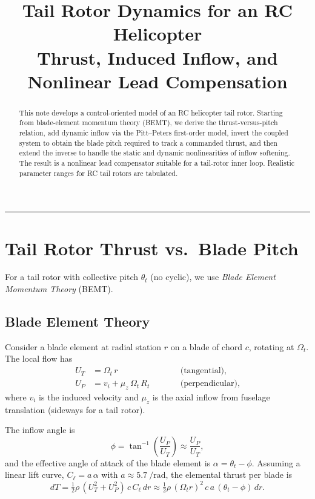 \documentclass[11pt,a4paper]{article}
\title{\textbf{Tail Rotor Dynamics for an RC Helicopter}\\[4pt]
\large Thrust, Induced Inflow, and Nonlinear Lead Compensation}
\author{}
\date{}
\newcommand{\OmegaT}{\Omega_t}
\newcommand{\Rt}{R_t}
\newcommand{\thetat}{\theta_t}
\newcommand{\vi}{v_i}
\begin{document}
\maketitle

\begin{abstract}
\noindent This note develops a control-oriented model of an RC helicopter tail rotor.
Starting from blade-element momentum theory (BEMT), we derive the thrust-versus-pitch
relation, add dynamic inflow via the Pitt--Peters first-order model, invert the
coupled system to obtain the blade pitch required to track a commanded thrust, and
then extend the inverse to handle the static and dynamic nonlinearities of inflow
softening. The result is a nonlinear lead compensator suitable for a tail-rotor
inner loop. Realistic parameter ranges for RC tail rotors are tabulated.
\end{abstract}

\tableofcontents
\vspace{1em}
\hrule
\vspace{1em}

\section{Tail Rotor Thrust vs.\ Blade Pitch}

For a tail rotor with collective pitch \(\thetat\) (no cyclic), we use
\emph{Blade Element Momentum Theory} (BEMT).

\subsection{Blade Element Theory}

Consider a blade element at radial station \(r\) on a blade of chord \(c\),
rotating at \(\OmegaT\). The local flow has
\begin{align}
U_T &= \OmegaT\,r \qquad &&\text{(tangential)},\\
U_P &= \vi + \mu_z\,\OmegaT\,\Rt \qquad &&\text{(perpendicular)},
\end{align}
where \(\vi\) is the induced velocity and \(\mu_z\) is the axial inflow from
fuselage translation (sideways for a tail rotor).

The inflow angle is
\begin{equation}
\phi = \tan^{-1}\!\left(\frac{U_P}{U_T}\right) \approx \frac{U_P}{U_T},
\end{equation}
and the effective angle of attack of the blade element is
\(\alpha = \thetat - \phi\).
Assuming a linear lift curve, \(C_\ell = a\,\alpha\) with
\(a\approx \SI{5.7}{\per\radian}\), the elemental thrust per blade is
\begin{equation}
dT = \tfrac{1}{2}\rho\,(U_T^2+U_P^2)\,c\,C_\ell\,dr
   \approx \tfrac{1}{2}\rho\,(\OmegaT r)^2\,c\,a\,(\thetat-\phi)\,dr.
\end{equation}
\end{document}
